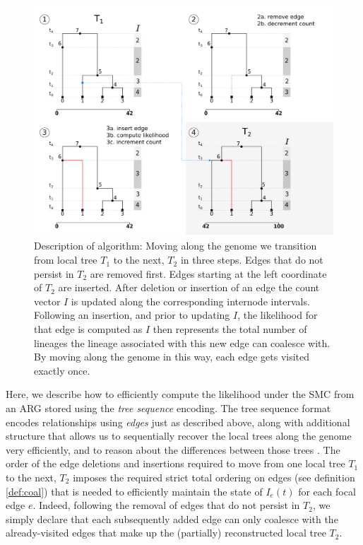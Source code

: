 \documentclass{article}
\begin{document}
\begin{figure}[!ht]
\centering
\includegraphics[width=\textwidth]{figures/ts_algo_2rows.png}
\caption{Description of algorithm: Moving along the genome we transition from
local tree $T_1$ to the next, $T_2$ in three steps. 
Edges that do not persist in $T_2$ are
removed first. Edges starting at the left coordinate of $T_2$ are inserted.
After deletion or insertion of an edge the count vector $I$ is updated along the
corresponding internode intervals. Following an insertion, and prior to updating $I$,
the likelihood for that edge is computed as $I$ then represents the total number of
lineages the lineage associated with this new edge can
coalesce with. By moving along the genome in this way, each edge gets visited exactly once.}
\label{fig:algo}
\end{figure}

Here, we describe how to efficiently compute the likelihood under the SMC
from an ARG stored using the \emph{tree sequence} encoding. %
The tree sequence format encodes relationships using \emph{edges}
just as described above,
along with additional structure that
allows us to sequentially recover the local trees
along the genome very efficiently, and to reason about
the differences between those trees \citep{kelleher_efficient_2016, ralph_efficiently_2020}.
The order of the edge deletions and insertions required to move from one local tree $T_1$ to
the next, $T_2$ imposes the required strict total ordering on edges
(see definition \ref{def:coal})
that is needed to efficiently maintain the state of $I_e(t)$ for each focal edge $e$.
Indeed, following the removal of edges that do not persist in $T_2$,
we simply declare that each subsequently added edge
can only coalesce with the already-visited edges 
that make up the (partially) reconstructed local tree $T_2$.
\end{document}
